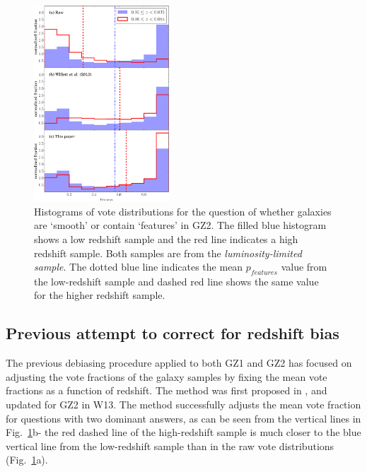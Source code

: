 \documentclass[useAMS,usenatbib]{mn2e}
\begin{document}
\begin{figure}
		\centering

        \includegraphics[width=0.45\textwidth]{Images/Bias/Biases/comparison_histogram-crop.pdf}

        \caption{Histograms of vote distributions for the question of whether galaxies are `smooth' or contain `features' in GZ2. The filled blue histogram shows a low redshift sample and the red line indicates a high redshift sample. Both samples are from the \textit{luminosity-limited sample}. The dotted blue line indicates the mean $p_{features}$ value from the low-redshift sample and dashed red line shows the same value for the higher redshift sample.}

        \label{fig:vote_histograms}

\end{figure}
\subsection{Previous attempt to correct for redshift bias}
\label{sec:previous_method}

The previous debiasing procedure applied to both GZ1 and GZ2 has focused on adjusting the vote fractions of the galaxy samples by fixing the mean vote fractions as a function of redshift. The method was first proposed in \cite{Bamford_09}, and updated for GZ2 in W13. The method successfully adjusts the mean vote fraction for questions with two dominant answers, as can be seen from the vertical lines in Fig.~\ref{fig:vote_histograms}b- the red dashed line of the high-redshift sample is much closer to the blue vertical line from the low-redshift sample than in the raw vote distributions (Fig.~\ref{fig:vote_histograms}a).
\end{document}
